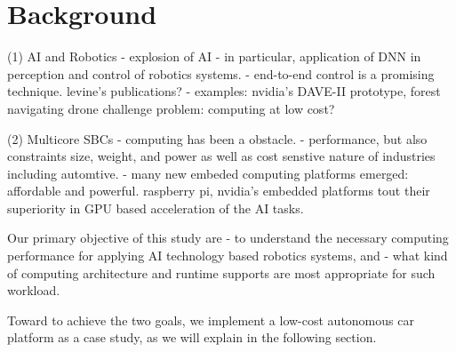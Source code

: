 \section{Background} \label{sec:background}

(1) AI and Robotics
- explosion of AI
- in particular, application of DNN in perception and control of robotics systems.
- end-to-end control is a promising technique.
  levine's publications?
- examples: nvidia's DAVE-II prototype, forest navigating drone
challenge problem: computing at low cost?


(2) Multicore SBCs
- computing has been a obstacle.
- performance, but also constraints size, weight, and power as well as
cost senstive nature of industries including automtive.
- many new embeded computing platforms emerged: affordable and
powerful. raspberry pi, nvidia's embedded platforms tout their
superiority in GPU based acceleration of the AI tasks.

Our primary objective of this study are
- to understand the necessary computing performance for applying AI
technology based robotics systems, and 
- what kind of computing architecture and runtime supports
are most appropriate for such workload.

Toward to achieve the two goals, we implement a low-cost autonomous
car platform as a case study, as we will explain in the following
section. 

